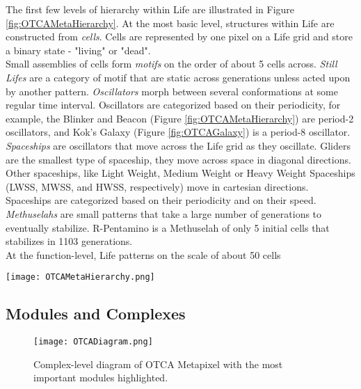 {The first few levels of hierarchy within Life are illustrated in Figure \ref{fig:OTCAMetaHierarchy}.  At the most basic level, structures within Life are constructed from \textit{cells}.  Cells are represented by one pixel on a Life grid and store a binary state - "living" or "dead".\\

Small assemblies of cells form \textit{motifs} on the order of about 5 cells across.  \textit{Still Lifes} are a category of motif that are static across generations unless acted upon by another pattern.  \textit{Oscillators} morph between several conformations at some regular time interval.  Oscillators are categorized based on their periodicity, for example, the Blinker and Beacon (Figure \ref{fig:OTCAMetaHierarchy}) are period-2 oscillators, and Kok's Galaxy (Figure \ref{fig:OTCAGalaxy}) is a period-8 oscillator.  \textit{Spaceships} are oscillators that move across the Life grid as they oscillate.  Gliders are the smallest type of spaceship, they move across space in diagonal directions.  Other spaceships, like Light Weight, Medium Weight or Heavy Weight Spaceships (LWSS, MWSS, and HWSS, respectively) move in cartesian directions.  Spaceships are categorized based on their periodicity and on their speed.  \textit{Methuselahs} are small patterns that take a large number of generations to eventually stabilize.  R-Pentamino is a Methuselah of only 5 initial cells that stabilizes in 1103 generations.\\

At the function-level, Life patterns on the scale of about 50 cells

\begin{sidewaysfigure}
  \texttt{[image: OTCAMetaHierarchy.png]}
  \caption{Hierarchical breakdown of OTCA Metapixel.}
  \label{fig:OTCAMetaHierarchy}
\end{sidewaysfigure}

\subsection{Modules and Complexes}

\begin{figure}
  \texttt{[image: OTCADiagram.png]}
  \caption{Complex-level diagram of OTCA Metapixel with the most important modules highlighted.}
  \label{fig:OTCADiagram}
\end{figure}



}
